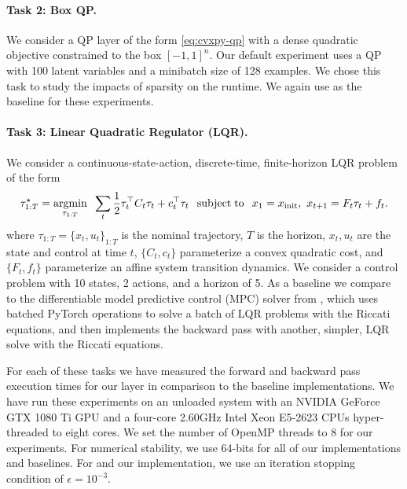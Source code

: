\paragraph{Task 2: Box QP.}
We consider a QP layer of the form
\cref{eq:cvxpy-qp} with a dense quadratic objective
constrained to the box $[-1, 1]^n$.
Our default experiment uses a QP with 100 latent
variables and a minibatch size of 128 examples.
We chose this task to study the impacts of
sparsity on the runtime.
We again use \qpth as the baseline for these experiments.

\paragraph{Task 3: Linear Quadratic Regulator (LQR).}
We consider a continuous-state-action, discrete-time, finite-horizon
LQR problem of the form
\begin{equation}
  \label{eq:cvxpyth:lqr}
  \tau^{\star}_{1:T} = \operatorname*{argmin}_{\tau_{1:T}}\;\;
  \sum_{t} \frac{1}{2} \tau_t^\top  C_t \tau_t + c_t^\top  \tau_t \;\;
  \operatorname*{subject\;to}\;\;
  x_1 = x_{\rm init},\
  x_{t+1} = F_t\tau_t + f_t.
\end{equation}
where $\tau_{1:T} = \{x_t, u_t\}_{1:T}$ is the nominal trajectory,
$T$ is the horizon,
$x_t, u_t$ are the state and control at time $t$,
$\{C_t, c_t\}$ parameterize a convex quadratic cost,
and $\{F_t, f_t\}$ parameterize an affine system
transition dynamics.
We consider a control problem with 10 states,
2 actions, and a horizon of 5.
As a baseline we compare to the differentiable model
predictive control (MPC) solver from
\citep{amos2018differentiable}, which uses batched
PyTorch operations to solve a batch of LQR problems with
the Riccati equations, and then implements the backward
pass with another, simpler, LQR solve with
the Riccati equations.

For each of these tasks we have measured the forward
and backward pass execution times for our layer in
comparison to the baseline implementations.
We have run these experiments on an unloaded system with
an NVIDIA GeForce GTX 1080 Ti GPU and
a four-core 2.60GHz Intel Xeon E5-2623 CPUs hyper-threaded
to eight cores.
We set the number of OpenMP threads to 8 for our experiments.
For numerical stability, we use 64-bits for all of
our implementations and baselines.
For \qpth and our implementation, we use an iteration
stopping condition of $\epsilon=10^{-3}$.

